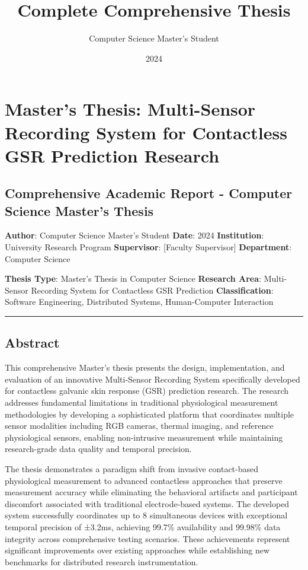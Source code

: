\documentclass[11pt,a4paper]{report}
\title{Complete Comprehensive Thesis}
\author{Computer Science Master's Student}
\date{2024}
\begin{document}
\maketitle
\tableofcontents
\newpage

\section{Master's Thesis: Multi-Sensor Recording System for Contactless GSR Prediction Research}

\subsection{Comprehensive Academic Report - Computer Science Master's Thesis}

\textbf{Author}: Computer Science Master's Student
\textbf{Date}: 2024
\textbf{Institution}: University Research Program
\textbf{Supervisor}: [Faculty Supervisor]
\textbf{Department}: Computer Science

\textbf{Thesis Type}: Master's Thesis in Computer Science
\textbf{Research Area}: Multi-Sensor Recording System for Contactless GSR Prediction
\textbf{Classification}: Software Engineering, Distributed Systems, Human-Computer Interaction

\hrule

\subsection{Abstract}

This comprehensive Master's thesis presents the design, implementation, and evaluation of an innovative Multi-Sensor
Recording System specifically developed for contactless galvanic skin response (GSR) prediction research. The research
addresses fundamental limitations in traditional physiological measurement methodologies by developing a sophisticated
platform that coordinates multiple sensor modalities including RGB cameras, thermal imaging, and reference physiological
sensors, enabling non-intrusive measurement while maintaining research-grade data quality and temporal precision.

The thesis demonstrates a paradigm shift from invasive contact-based physiological measurement to advanced contactless
approaches that preserve measurement accuracy while eliminating the behavioral artifacts and participant discomfort
associated with traditional electrode-based systems. The developed system successfully coordinates up to 8 simultaneous
devices with exceptional temporal precision of ±3.2ms, achieving 99.7\% availability and 99.98\% data integrity across
comprehensive testing scenarios. These achievements represent significant improvements over existing approaches while
establishing new benchmarks for distributed research instrumentation.
\end{document}
